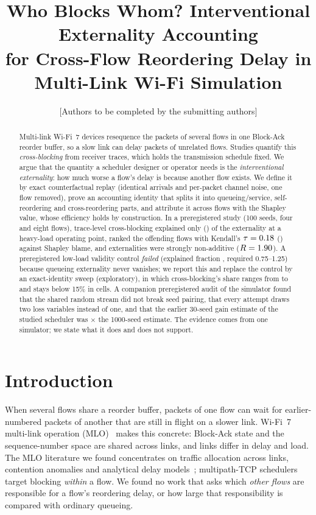 \documentclass[11pt]{article}
\title{Who Blocks Whom? Interventional Externality Accounting\\for Cross-Flow Reordering Delay in Multi-Link Wi-Fi Simulation}
\author{[Authors to be completed by the submitting authors]}
\date{}
\begin{document}
\maketitle

\begin{abstract}
Multi-link Wi-Fi~7 devices resequence the packets of several flows in one Block-Ack reorder buffer, so a slow link can delay packets of unrelated flows.
Studies quantify this \emph{cross-blocking} from receiver traces, which holds the transmission schedule fixed.
We argue that the quantity a scheduler designer or operator needs is the \emph{interventional externality}: how much worse a flow's delay is because another flow exists.
We define it by exact counterfactual replay (identical arrivals and per-packet channel noise, one flow removed), prove an accounting identity that splits it into queueing/service, self-reordering and cross-reordering parts, and attribute it across flows with the Shapley value, whose efficiency holds by construction.
In a preregistered study (100 seeds, four and eight flows), trace-level cross-blocking explained only \SBrFour{} (\SBrFourCI) of the externality at a heavy-load operating point, ranked the offending flows with Kendall's $\tau=0.18$ (\SBtauFourCI) against Shapley blame, and externalities were strongly non-additive ($R=1.90$).
A preregistered low-load validity control \emph{failed} (explained fraction \SBVthree{}, required 0.75--1.25) because queueing externality never vanishes; we report this and replace the control by an exact-identity sweep (exploratory), in which cross-blocking's share ranges from \SBBCrossMin{} to \SBBCrossMax{} and stays below 15\% in \SBBCrossBelowFifteen{} cells.
A companion preregistered audit of the simulator found that the shared random stream did not break seed pairing, that every attempt draws two loss variables instead of one, and that the earlier 30-seed gain estimate of the studied scheduler was \OldRatio{}$\times$ the 1000-seed estimate.
The evidence comes from one simulator; we state what it does and does not support.
\end{abstract}

\section{Introduction}
When several flows share a reorder buffer, packets of one flow can wait for earlier-numbered packets of another that are still in flight on a slower link.
Wi-Fi~7 multi-link operation (MLO)~\cite{ieee80211be2024} makes this concrete: Block-Ack state and the sequence-number space are shared across links, and links differ in delay and load.
The MLO literature we found concentrates on traffic allocation across links, contention anomalies and analytical delay models~\cite{lopezraventos2022mlo,carrascosa2023understanding}; multipath-TCP schedulers target blocking \emph{within} a flow.
We found no work that asks which \emph{other flows} are responsible for a flow's reordering delay, or how large that responsibility is compared with ordinary queueing.
\end{document}
